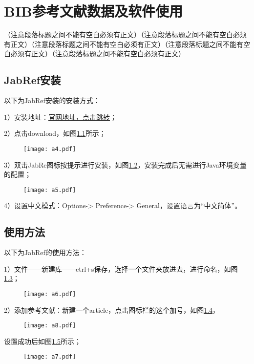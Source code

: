 \documentclass{standalone}
\begin{document}
\chapter{BIB参考文献数据及软件使用}

（注意段落标题之间不能有空白必须有正文）（注意段落标题之间不能有空白必须有正文）（注意段落标题之间不能有空白必须有正文）（注意段落标题之间不能有空白必须有正文）（注意段落标题之间不能有空白必须有正文）

\label{chap4}

\section{JabRef安装}
以下为JabRef安装的安装方式：

1）安装地址：\href{https://www.jabref.org/}{官网地址，点击跳转}；

2）点击download，如图\ref{fig_3}所示；
\begin{figure}[htbp]
	\centering
	\texttt{[image: a4.pdf]}
	\label{fig_3}
\end{figure}

3）双击JabRe图标按提示进行安装，如图\ref{fig_4}，安装完成后无需进行Java环境变量的配置；
\begin{figure}[htbp]
	\centering
	\texttt{[image: a5.pdf]}
	\label{fig_4}
\end{figure}

4）设置中文模式：Options-> Preference-> General，设置语言为“中文简体”。


\section{使用方法}
以下为JabRef的使用方法：

1）文件——新建库——ctrl+s保存，选择一个文件夹放进去，进行命名，如图\ref{fig_5}；
\begin{figure}[htbp]
	\centering
	\texttt{[image: a6.pdf]}
	\label{fig_5}
\end{figure}

2）添加参考文献：新建一个article，点击图标栏的这个加号，如图\ref{fig_7}，
\begin{figure}[htbp]
	\centering
	\texttt{[image: a8.pdf]}
	\label{fig_7}
\end{figure}
设置成功后如图\ref{fig_6}所示；
\begin{figure}[htbp]
	\centering
	\texttt{[image: a7.pdf]}
	\label{fig_6}
\end{figure}
\end{document}
